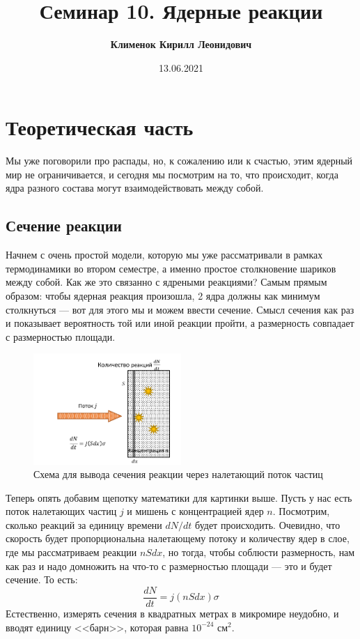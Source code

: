 \documentclass[12pt]{article}
\begin{document}
 
\title{\textbf{Семинар 10. Ядерные реакции }}
\author{\textbf{Клименок Кирилл Леонидович}}
\date{13.06.2021}
\maketitle
\section{Теоретическая часть}
Мы уже поговорили про распады, но, к сожалению или к счастью, этим ядерный мир не ограничивается, и сегодня мы посмотрим на то, что происходит, когда ядра разного состава могут взаимодействовать между собой.

\subsection{Сечение реакции}
Начнем с очень простой модели, которую мы уже рассматривали в рамках термодинамики во втором семестре, а именно простое столкновение шариков между собой. Как же это связанно с ядреными реакциями? Самым прямым образом: чтобы ядерная реакция произошла, 2 ядра должны как минимум столкнуться --- вот для этого мы и можем ввести сечение. Смысл сечения как раз и показывает вероятность той или иной реакции пройти, а размерность совпадает с размерностью площади.
\begin{figure}[h]
    \centering
    \includegraphics[width=0.5\textwidth,height=\textheight,keepaspectratio]{Seminar_10/pics/pic_01_sigma.pdf}
    \caption{Схема для вывода сечения реакции через налетающий поток частиц}
    \label{fig:sem_10_sigma}
\end{figure}

\noindent
Теперь опять добавим щепотку математики для картинки выше. Пусть у нас есть поток налетающих частиц $j$ и мишень с концентрацией ядер $n$. Посмотрим, сколько реакций за единицу времени $dN/dt$ будет происходить. Очевидно, что скорость будет пропорциональна налетающему потоку и количеству ядер в слое, где мы рассматриваем реакции $nSdx$, но тогда, чтобы соблюсти размерность, нам как раз и надо домножить на что-то с размерностью площади --- это и будет сечение. То есть:
\begin{equation*}
    \dfrac{dN}{dt} = j (nSdx) \sigma
\end{equation*}
Естественно, измерять сечения в квадратных метрах в микромире неудобно, и вводят единицу <<барн>>, которая равна $10^{-24}$ $\text{см}^2$.
\end{document}
